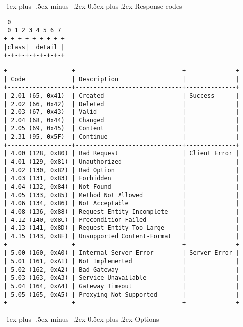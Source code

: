 \documentclass[a4,10pt,landscape]{article}
\makeatletter
\renewcommand{\section}{\@startsection{section}{1}{0mm}%
                                {-1ex plus -.5ex minus -.2ex}%
                                {0.5ex plus .2ex}%
                                {\normalfont\large\bfseries}}
\makeatother
\begin{document}
\begin{multicols}{3}
\section{Response codes}

{\tiny
\begin{verbatim}
 0
 0 1 2 3 4 5 6 7
+-+-+-+-+-+-+-+-+
|class|  detail |
+-+-+-+-+-+-+-+-+
\end{verbatim}
}

{\tiny
\begin{verbatim}
+------------------+------------------------------+--------------+
| Code             | Description                  |              |
+------------------+------------------------------+--------------+
| 2.01 (65, 0x41)  | Created                      | Success      |
| 2.02 (66, 0x42)  | Deleted                      |              |
| 2.03 (67, 0x43)  | Valid                        |              |
| 2.04 (68, 0x44)  | Changed                      |              |
| 2.05 (69, 0x45)  | Content                      |              |
| 2.31 (95, 0x5F)  | Continue                     |              |
+------------------+------------------------------+--------------+
| 4.00 (128, 0x80) | Bad Request                  | Client Error |
| 4.01 (129, 0x81) | Unauthorized                 |              |
| 4.02 (130, 0x82) | Bad Option                   |              |
| 4.03 (131, 0x83) | Forbidden                    |              |
| 4.04 (132, 0x84) | Not Found                    |              |
| 4.05 (133, 0x85) | Method Not Allowed           |              |
| 4.06 (134, 0x86) | Not Acceptable               |              |
| 4.08 (136, 0x88) | Request Entity Incomplete    |              |
| 4.12 (140, 0x8C) | Precondition Failed          |              |
| 4.13 (141, 0x8D) | Request Entity Too Large     |              |
| 4.15 (143, 0x8F) | Unsupported Content-Format   |              |
+------------------+------------------------------+--------------+
| 5.00 (160, 0xA0) | Internal Server Error        | Server Error |
| 5.01 (161, 0xA1) | Not Implemented              |              |
| 5.02 (162, 0xA2) | Bad Gateway                  |              |
| 5.03 (163, 0xA3) | Service Unavailable          |              |
| 5.04 (164, 0xA4) | Gateway Timeout              |              |
| 5.05 (165, 0xA5) | Proxying Not Supported       |              |
+------------------+------------------------------+--------------+
\end{verbatim}
}

\section{Options}


\end{multicols}
\end{document}
